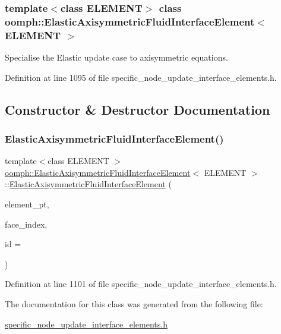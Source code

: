 \subsubsection*{template$<$class E\+L\+E\+M\+E\+NT$>$\newline
class oomph\+::\+Elastic\+Axisymmetric\+Fluid\+Interface\+Element$<$ E\+L\+E\+M\+E\+N\+T $>$}

Specialise the Elastic update case to axisymmetric equations. 

Definition at line 1095 of file specific\+\_\+node\+\_\+update\+\_\+interface\+\_\+elements.\+h.



\subsection{Constructor \& Destructor Documentation}
\mbox{\label{classoomph_1_1ElasticAxisymmetricFluidInterfaceElement_a9cb419f11aa4504bca4b6a9c40cca505}} 
\subsubsection{\texorpdfstring{Elastic\+Axisymmetric\+Fluid\+Interface\+Element()}{ElasticAxisymmetricFluidInterfaceElement()}}
{\footnotesize\ttfamily template$<$class E\+L\+E\+M\+E\+NT $>$ \\
\hyperlink{classoomph_1_1ElasticAxisymmetricFluidInterfaceElement}{oomph\+::\+Elastic\+Axisymmetric\+Fluid\+Interface\+Element}$<$ E\+L\+E\+M\+E\+NT $>$\+::\hyperlink{classoomph_1_1ElasticAxisymmetricFluidInterfaceElement}{Elastic\+Axisymmetric\+Fluid\+Interface\+Element} (\begin{DoxyParamCaption}\item[{Finite\+Element $\ast$const \&}]{element\+\_\+pt,  }\item[{const int \&}]{face\+\_\+index,  }\item[{const unsigned \&}]{id = {} }\end{DoxyParamCaption})\hspace{0.3cm}{\ttfamily [inline]}}



Definition at line 1101 of file specific\+\_\+node\+\_\+update\+\_\+interface\+\_\+elements.\+h.



The documentation for this class was generated from the following file\+:\begin{DoxyCompactItemize}
\item 
\hyperlink{specific__node__update__interface__elements_8h}{specific\+\_\+node\+\_\+update\+\_\+interface\+\_\+elements.\+h}\end{DoxyCompactItemize}
